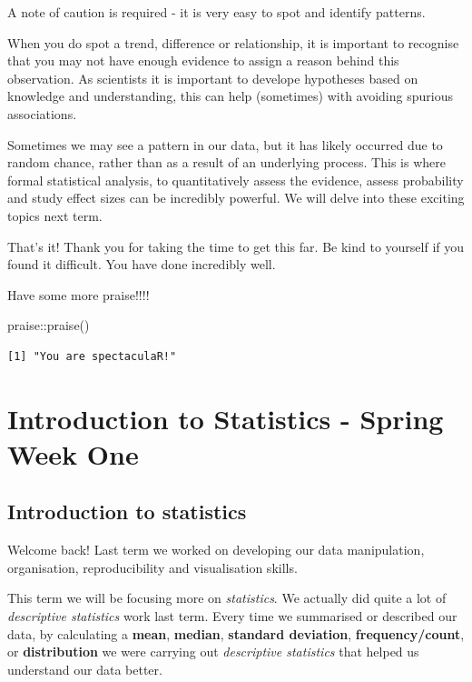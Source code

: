\documentclass[
]{book}
\newenvironment{Shaded}{\begin{snugshade}}{\end{snugshade}}
\newcommand{\FunctionTok}[1]{\textcolor[rgb]{0.00,0.00,0.00}{#1}}
\newcommand{\NormalTok}[1]{#1}
\newcommand{\SpecialCharTok}[1]{\textcolor[rgb]{0.00,0.00,0.00}{#1}}
\begin{document}
A note of caution is required - it is very easy to spot and identify patterns.

When you do spot a trend, difference or relationship, it is important to recognise that you may not have enough evidence to assign a reason behind this observation. As scientists it is important to develope hypotheses based on knowledge and understanding, this can help (sometimes) with avoiding spurious associations.

Sometimes we may see a pattern in our data, but it has likely occurred due to random chance, rather than as a result of an underlying process. This is where formal statistical analysis, to quantitatively assess the evidence, assess probability and study effect sizes can be incredibly powerful. We will delve into these exciting topics next term.

That's it! Thank you for taking the time to get this far. Be kind to yourself if you found it difficult. You have done incredibly well.

Have some more praise!!!!

\begin{Shaded}
\begin{Highlighting}[]
\NormalTok{praise}\SpecialCharTok{::}\FunctionTok{praise}\NormalTok{()}
\end{Highlighting}
\end{Shaded}

\begin{verbatim}
[1] "You are spectaculaR!"
\end{verbatim}

\hypertarget{introduction-to-statistics---spring-week-one}{%
\chapter{Introduction to Statistics - Spring Week One}\label{introduction-to-statistics---spring-week-one}}

\hypertarget{introduction-to-statistics}{%
\section{Introduction to statistics}\label{introduction-to-statistics}}

Welcome back! Last term we worked on developing our data manipulation, organisation, reproducibility and visualisation skills.

This term we will be focusing more on \emph{statistics}. We actually did quite a lot of \emph{descriptive statistics} work last term. Every time we summarised or described our data, by calculating a \textbf{mean}, \textbf{median}, \textbf{standard deviation}, \textbf{frequency/count}, or \textbf{distribution} we were carrying out \emph{descriptive statistics} that helped us understand our data better.
\end{document}
